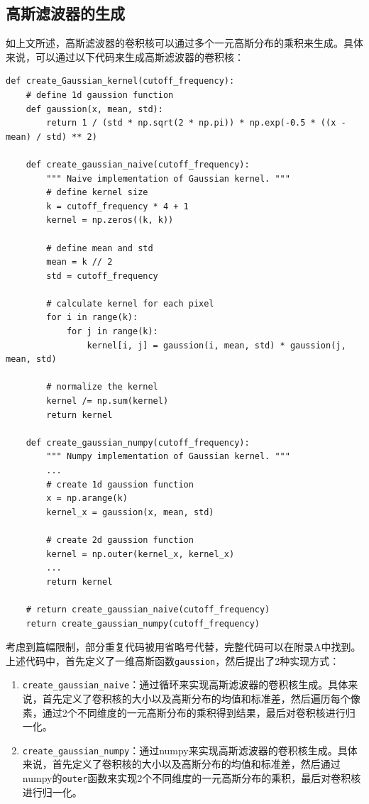 \documentclass{article}
\begin{document}
\subsection{高斯滤波器的生成}

如上文所述，高斯滤波器的卷积核可以通过多个一元高斯分布的乘积来生成。具体来说，可以通过以下代码来生成高斯滤波器的卷积核：

\begin{lstlisting}[style=Python]
def create_Gaussian_kernel(cutoff_frequency):
    # define 1d gaussion function
    def gaussion(x, mean, std):
        return 1 / (std * np.sqrt(2 * np.pi)) * np.exp(-0.5 * ((x - mean) / std) ** 2)

    def create_gaussian_naive(cutoff_frequency):
        """ Naive implementation of Gaussian kernel. """
        # define kernel size
        k = cutoff_frequency * 4 + 1
        kernel = np.zeros((k, k))

        # define mean and std
        mean = k // 2
        std = cutoff_frequency
        
        # calculate kernel for each pixel
        for i in range(k):
            for j in range(k):
                kernel[i, j] = gaussion(i, mean, std) * gaussion(j, mean, std)
        
        # normalize the kernel
        kernel /= np.sum(kernel)
        return kernel

    def create_gaussian_numpy(cutoff_frequency):
        """ Numpy implementation of Gaussian kernel. """
        ...
        # create 1d gaussion function
        x = np.arange(k)
        kernel_x = gaussion(x, mean, std)
        
        # create 2d gaussion function
        kernel = np.outer(kernel_x, kernel_x)
        ...
        return kernel

    # return create_gaussian_naive(cutoff_frequency)
    return create_gaussian_numpy(cutoff_frequency)
\end{lstlisting}

考虑到篇幅限制，部分重复代码被用省略号代替，完整代码可以在附录A中找到。上述代码中，首先定义了一维高斯函数\texttt{gaussion}，然后提出了2种实现方式：

\begin{enumerate}
    \item \texttt{create\_gaussian\_naive}：通过循环来实现高斯滤波器的卷积核生成。具体来说，首先定义了卷积核的大小以及高斯分布的均值和标准差，然后遍历每个像素，通过2个不同维度的一元高斯分布的乘积得到结果，最后对卷积核进行归一化。
    \item \texttt{create\_gaussian\_numpy}：通过numpy来实现高斯滤波器的卷积核生成。具体来说，首先定义了卷积核的大小以及高斯分布的均值和标准差，然后通过numpy的\texttt{outer}函数来实现2个不同维度的一元高斯分布的乘积，最后对卷积核进行归一化。
\end{enumerate}
\end{document}
